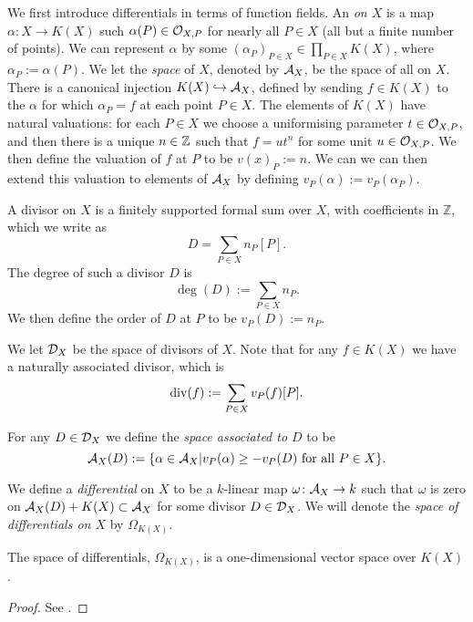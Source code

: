 We first introduce differentials in terms of function fields.
An {\em \adele on $X$} is a map $\alpha\colon  X \rightarrow K(X)$ such $\alpha(P) \in {\cal O}_{X,P}$ for nearly all $P \in X$ (\ie all but a finite number of points).
We can represent $\alpha$ by some $(\alpha_P)_{P \in X} \in \prod_{P \in X} K(X)$, where $\alpha_P := \alpha(P)$.
We let the {\em \adele space} of $X$, denoted by ${\mathcal A}_X$, be the space of all \adeles on $X$.
There is a canonical injection $K(X) \hookrightarrow  {\mathcal A}_X$, defined by sending $f\in K(X)$ to the \adele $\alpha$ for which $\alpha_P =  f$ at each point $P\in X$.
The elements of $K(X)$ have natural valuations: for each $P\in X$ we choose a uniformising parameter $t\in {\cal O}_{X,P}$, and then there is a unique $n \in {\mathbb Z}$ such that $f=ut^n$ for some unit $u\in {\cal O}_{X,P}$.
We then define the valuation of $f$ at $P$ to be $v(x)_P := n$.
We can we can then extend this valuation to elements of ${\mathcal A}_X$ by defining $v_P(\alpha) := v_P(\alpha_P)$.

A divisor on $X$ is a finitely supported formal sum over $X$, with coefficients in $\mathbb Z$, which we write as 
    \[
    D = \sum_{P\in X} n_P [P].
    \]
The degree of such a divisor $D$ is 
    \[
    \deg(D) := \sum_{P\in X} n_P.
    \]
We then define the order of $D$ at $P$ to be $v_P(D) := n_P$.

We let ${\mathcal D}_X$ be the space of divisors of $X$.
Note that for any $f\in K(X)$ we have a naturally associated divisor, which is
    \[
    \operatorname{div}(f) := \sum_{P\in X} v_P(f) [P].
    \]

For any $D\in {\mathcal D}_X$ we define the {\em \adele space associated to $D$} to be
    \[
    {\mathcal A}_X(D):=\{\alpha \in {\mathcal A}_X | v_P(\alpha) \geq -v_P(D)\ \text{for all} \ P\in X\}.
    \]


    \begin{defn}
    We define a {\em differential} on $X$ to be a $k$-linear map $\omega\colon  {\mathcal A}_X \rightarrow k$ such that $\omega$ is zero on ${\mathcal A}_X(D) +K(X) \subset {\mathcal A}_X$ for some divisor $D\in {\mathcal D}_X$.
    We will denote the {\em space of differentials on $X$} by $\Omega_{K(X)}$.
    \end{defn}
    
    \begin{prop}
    The space of differentials, $\Omega_{K(X)}$, is a one-dimensional vector space over $K(X)$.
    \end{prop}
    \begin{proof}
    See \cite[Prop. 1.5.9]{stichtenoth}.
    \end{proof}

